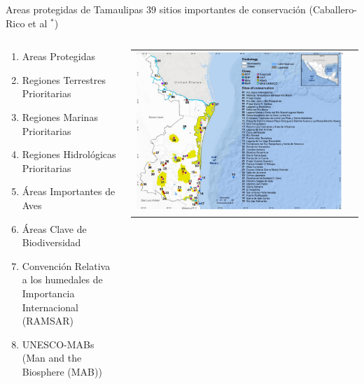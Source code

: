 \documentclass[aspectratio=169,compress]{beamer}
\begin{document}
\begin{frame}{Areas protegidas de Tamaulipas}
39 sitios importantes de conservación (Caballero-Rico et al \cite{u14010494}$^*$)
\begin{columns}
\begin{column}{0.60\textwidth}
	\begin{enumerate}  %
\item Areas Protegidas
\item Regiones Terrestres Prioritarias
\item Regiones Marinas Prioritarias
\item Regiones Hidrológicas Prioritarias
\item Áreas Importantes de Aves 
\item Áreas Clave de Biodiversidad
\item Convención Relativa a los humedales de Importancia Internacional (RAMSAR)
\item UNESCO-MABs (Man and the Biosphere (MAB))
	\end{enumerate}
\end{column}

\begin{column}{0.40\textwidth}  
\begin{center}
     \begin{tabular}{cc}
\includegraphics[width=1.00\linewidth]{figs/MapaTamps.png}\\
      \end{tabular}
\end{center}
\end{column} 
\end{columns} 
\end{frame}
\end{document}
